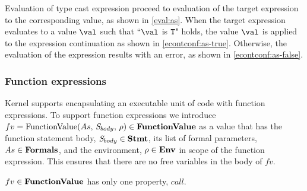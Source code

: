 \documentclass[a4paper,oneside]{article}
\begin{document}
Evaluation of type cast expression proceed to evaluation of the target expression to the corresponding value, as shown in \eqref{eval:as}.
When the target expression evaluates to a value $\val$ such that ``$\val $ is $\tt{T}$" holds, the value $\val$ is applied to the expression continuation as shown in \eqref{econtconf:as-true}.
Otherwise, the evaluation of the expression results with an error, as shown in \eqref{econtconf:as-false}.


\subsubsection{Function expressions}
\label{subsubsec:function-expressions}

Kernel supports encapsulating an executable unit of code with function expressions.
To support function expressions we introduce $fv = \mathrm{FunctionValue}({As},\,{\mathit{S}_{body}},\,{\rho}) \in \mathbf{FunctionValue}$ as a value that has the function statement body, $\mathit{S}_{body} \in \mathbf{Stmt}$, its list of formal parameters, $As \in \mathbf{Formals}$, and the environment, $\rho \in \mathbf{Env}$ in scope of the function expression.
This ensures that there are no free variables in the body of $fv$.

$fv \in \mathbf{FunctionValue}$ has only one property, $call$.
\end{document}
